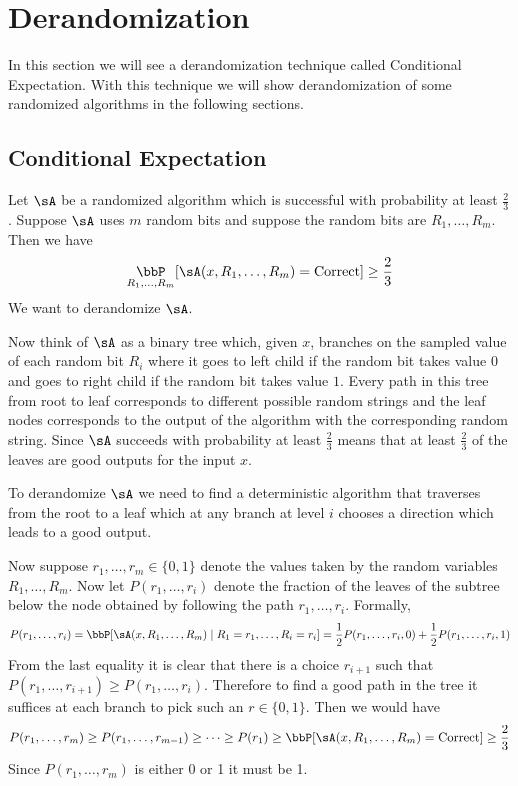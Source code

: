 \chapter{Derandomization}
In this section we will see a derandomization technique called Conditional Expectation. With this technique we will show derandomization of some randomized algorithms in the following sections.
\section{Conditional Expectation}
Let $\sA$ be a randomized algorithm which is successful with probability at least $\frac23$. Suppose $\sA$ uses $m$ random bits and suppose the random bits are $R_1,\dots , R_m$. Then we have $$\underset{R_1,\dots, R_m}{\bbP}[\sA(x,R_1,\dots, R_m)=\text{Correct}]\geq \frac23$$We want to derandomize $\sA$.

Now think of $\sA$ as a binary tree which, given $x$, branches on the sampled value of each random bit $R_i$ where it goes to left child if the random bit takes value $0$ and goes to right child if the random bit takes value $1$. Every path in this tree from root to leaf corresponds to different possible random strings and the leaf nodes corresponds to the output of the algorithm with the corresponding random string. Since $\sA$ succeeds with probability at least $\frac23$ means that at least $\frac23$ of the leaves are good outputs for the input $x$.

\begin{idea*}
	To derandomize $\sA$ we need to find a deterministic algorithm that traverses from the root to a leaf which at any branch at level $i$ chooses a direction which leads to a good output.
\end{idea*}

Now suppose $r_1,\dots, r_m\in \{0,1\}$ denote the values taken by the random variables $R_1,\dots, R_m$. Now let $P(r_1,\dots, r_i)$ denote the fraction of the leaves of the subtree below the node obtained  by following the path $r_1,\dots, r_i$. Formally, $$P(r_1,\dots, r_i)=\bbP[\sA(x,R_1,\dots, R_m)\mid R_1=r_1,\dots, R_i=r_i]=\frac12P(r_1,\dots, r_i,0)+\frac12P(r_1,\dots, r_i,1)$$From the last equality it is clear that there is a choice $r_{i+1}$ such that $P(r_1,\dots, r_{i+1})\geq P(r_1,\dots, r_i)$. Therefore to find a good path in the tree it suffices at each branch to pick such an $r\in \{0,1\}$. Then we would have $$P(r_1,\dots,r_m)\geq P(r_1,\dots, r_{m-1})\geq \cdots\geq P(r_1)\geq \bbP[\sA(x, R_1,\dots, R_m)=\text{Correct}]\geq \frac23$$Since $P(r_1,\dots, r_m)$ is either 0 or 1 it must be 1.
